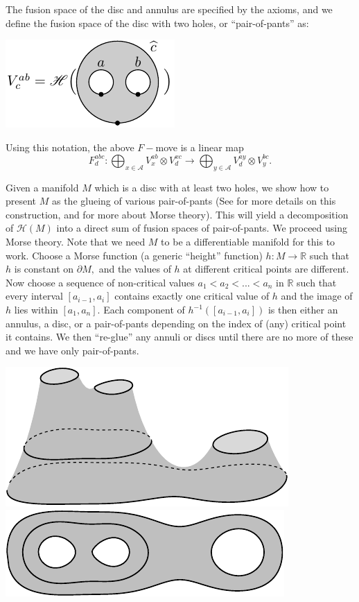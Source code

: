 \documentclass[aps, prl, letterpaper, twocolumn, superscriptaddress, notitlepage, 10pt]{revtex4-1}
\newcommand{\F}{\mathscr{H}} %
\newcommand{\R}{\mathbb{R}}
\newcommand{\A}{\mathcal{A}}
\begin{document}
The fusion space of the disc and annulus are
specified by the axioms, and we define the fusion
space of the disc with two holes, or ``pair-of-pants''
as:
\begin{center}
\includegraphics[]{pic-pop.pdf}
\end{center}
Using this notation, the above $F-$move
is a linear map
$$
    F^{abc}_d : \bigoplus_{x\in\A} V^{ab}_x\otimes V^{xc}_d 
        \to \bigoplus_{y\in\A} V^{ay}_d\otimes V^{bc}_y.
$$

Given a manifold $M$ which is
a disc with at least two holes, 
we show how to present $M$ as the glueing of various
pair-of-pants 
(See \cite{Ivanov2001} for more details on this construction,
and \cite{Ghrist2014} for more about Morse theory).
This will yield a decomposition of $\F(M)$ into a direct
sum of fusion spaces of pair-of-pants. %
We proceed using Morse theory.
Note that we need $M$ to be a differentiable manifold for
this to work.
Choose a Morse function (a generic ``height'' function) $h:M\to\R$
such that $h$ is constant on $\partial M,$
and the values of $h$ at different critical points are different.
Now choose a sequence of non-critical values $a_1<a_2<...<a_n$ in $\R$
such that every interval $[a_{i-1}, a_i]$ 
contains exactly one critical value of $h$ and the image
of $h$ lies within $[a_1, a_n].$
Each component of $h^{-1}([a_{i-1}, a_i])$ is then either
an annulus, a disc, or a pair-of-pants depending on the index of (any)
critical point it contains.
We then ``re-glue'' any annuli or discs until there are no more of these
and we have only pair-of-pants.
\begin{center}
\includegraphics[]{pic-pants.pdf}\ \ \ \ \ \ \ \ \includegraphics[]{pic-pants-1.pdf}
\end{center}
\end{document}
